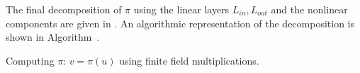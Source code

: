 The final decomposition of $\pi$ using the linear layers $L_{in}, L_{out}$ and the nonlinear components are given in . An algorithmic representation of the decomposition is shown in Algorithm~.


\begin{algorithm}
    \caption{
    Computing $\pi$: $v = \pi(u)$ using finite field multiplications.
    }
    \begin{algorithmic}[1]
        \Else
             
        \EndIf
         
    \end{algorithmic}
\end{algorithm}